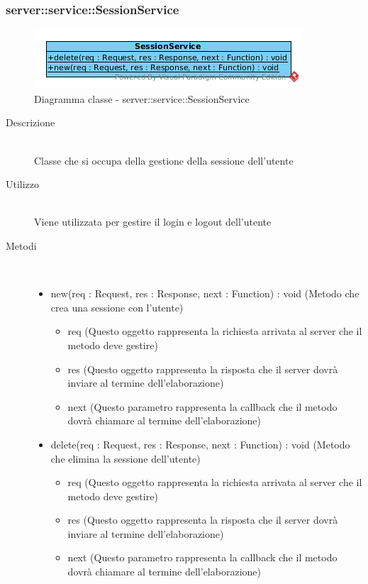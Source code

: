 \vspace{0.5cm}
\hypertarget{server::service::SessionService}{}
\subsubsection[SessionService]{server::service::SessionService}
\begin{center}
			\begin{figure}[H]
				\centering \includegraphics[scale=4, max width=\textwidth, max height=\myheight]{../img/diagrammiClassi/server/service/SessionService.png}
				\caption{Diagramma classe - server::service::SessionService}
			\end{figure}
		\end{center}\begin{description}
\item[Descrizione] \hfill \\
 Classe che si occupa della gestione della sessione dell'utente
\item[Utilizzo] \hfill \\
 Viene utilizzata per gestire il login e logout dell'utente
\item[Metodi] \hfill \\
 \vspace{-7mm}
\begin{itemize}
\item new(req : Request, res : Response, next : Function) : void (Metodo che crea una sessione con l'utente)\begin{itemize}
\item req (Questo oggetto rappresenta la richiesta arrivata al server che il metodo deve gestire)
\item res (Questo oggetto rappresenta la risposta che il server dovrà inviare al termine dell'elaborazione)
\item next (Questo parametro rappresenta la callback che il metodo dovrà chiamare al termine dell’elaborazione)
\end{itemize}

\item delete(req : Request, res : Response, next : Function) : void (Metodo che elimina la sessione dell'utente)\begin{itemize}
\item req (Questo oggetto rappresenta la richiesta arrivata al server che il metodo deve gestire)
\item res (Questo oggetto rappresenta la risposta che il server dovrà inviare al termine dell'elaborazione)
\item next (Questo parametro rappresenta la callback che il metodo dovrà chiamare al termine dell’elaborazione)
\end{itemize}

\end{itemize}

\end{description}

